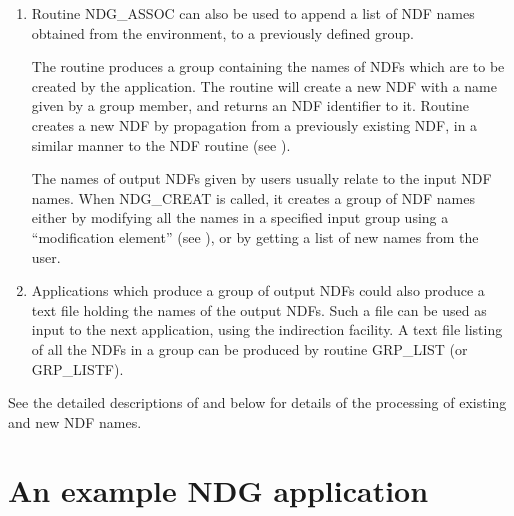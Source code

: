 \begin{enumerate}
\item Routine NDG\_ASSOC can also be used to append a list of NDF names 
obtained from the environment, to a previously defined group.

The routine  produces a group containing the names of 
NDFs which are to be created by the application. The routine  will 
create a new NDF with a name given by a group member, and returns an NDF 
identifier to it. Routine  creates a new NDF by propagation from a 
previously existing NDF, in a similar manner to the NDF routine  (see 
).

The names of output NDFs given by users usually relate to the input NDF names.
When NDG\_CREAT is called, it creates a group of NDF names either by modifying
all the names in a specified input group using a ``modification element'' (see
), or by getting a list of new names from the user. 

\item Applications which produce a group of output NDFs could also produce a
text file holding the names of the output NDFs. Such a file can be used
as input to the next application, using the indirection facility. A text
file listing of all the NDFs in a group can be produced by routine
GRP\_LIST (or GRP\_LISTF).

\end{enumerate}

See the detailed descriptions of  and  below for details 
of the processing of existing and new NDF names.

\section{An example NDG application}

